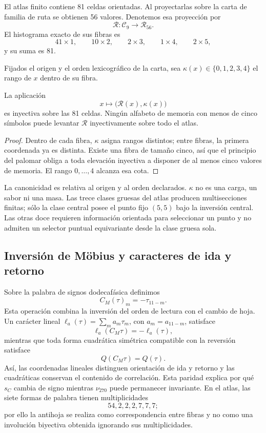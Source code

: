 El atlas finito contiene 81 celdas orientadas. Al proyectarlas sobre la carta
de familia de ruta se obtienen 56 valores. Denotemos esa proyección por
\[
 \mathcal R:\mathcal C_9\longrightarrow\mathcal R_{56}.
\]
El histograma exacto de sus fibras es
\[
 41\times1,
 \qquad10\times2,
 \qquad2\times3,
 \qquad1\times4,
 \qquad2\times5,
\]
y su suma es 81.

Fijados el origen y el orden lexicográfico de la carta, sea
\(\kappa(x)\in\{0,1,2,3,4\}\) el rango de \(x\) dentro de su fibra.

\begin{theorem}
\label{thm:selector-interno-minimo}
La aplicación
\[
 x\longmapsto\bigl(\mathcal R(x),\kappa(x)\bigr)
\]
es inyectiva sobre las 81 celdas. Ningún alfabeto de memoria con menos de
cinco símbolos puede levantar \(\mathcal R\) inyectivamente sobre todo el
atlas.
\end{theorem}

\begin{proof}
Dentro de cada fibra, \(\kappa\) asigna rangos distintos; entre fibras, la
primera coordenada ya es distinta. Existe una fibra de tamaño cinco, así que
el principio del palomar obliga a toda elevación inyectiva a disponer de al menos
cinco valores de memoria. El rango \(0,\ldots,4\) alcanza esa cota.
\end{proof}

La canonicidad es relativa al origen y al orden declarados. \(\kappa\) no es
una carga, un sabor ni una masa. Las trece clases gruesas del atlas producen
multisecciones finitas; sólo la clase central posee el punto fijo \((5,5)\)
bajo la inversión central. Las otras doce requieren información orientada
para seleccionar un punto y no admiten un selector puntual equivariante desde
la clase gruesa sola.

\subsection{Inversión de Möbius y caracteres de ida y retorno}

Sobre la palabra de signos dodecafásica definimos
\[
 C_M(\tau)_m=-\tau_{11-m}.
\]
Esta operación combina la inversión del orden de lectura con el cambio de
hoja. Un carácter lineal
\(\ell_a(\tau)=\sum_ma_m\tau_m\), con
\(a_m=a_{11-m}\), satisface
\[
 \ell_a(C_M\tau)=-\ell_a(\tau),
\]
mientras que toda forma cuadrática simétrica compatible con la reversión
satisface
\[
 Q(C_M\tau)=Q(\tau).
\]
Así, las coordenadas lineales distinguen orientación de ida y retorno y las
cuadráticas conservan el contenido de correlación. Esta paridad explica por
qué \(s_C\) cambia de signo mientras \(\nu_{270}\) puede permanecer
invariante. En el atlas, las siete formas de palabra tienen multiplicidades
\[
 54,2,2,2,7,7,7;
\]
por ello la antihoja se realiza como correspondencia entre fibras y no como
una involución biyectiva obtenida ignorando sus multiplicidades.

